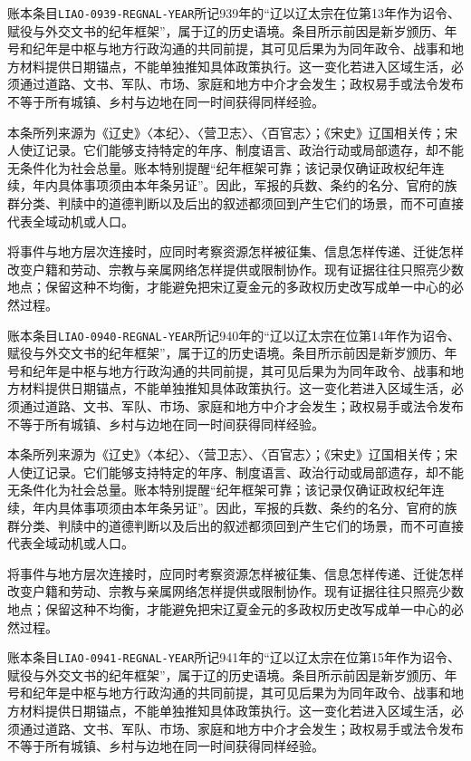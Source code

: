 账本条目\texttt{LIAO-0939-REGNAL-YEAR}所记939年的“辽以辽太宗在位第13年作为诏令、赋役与外交文书的纪年框架”，属于辽的历史语境。条目所示前因是新岁颁历、年号和纪年是中枢与地方行政沟通的共同前提，其可见后果为为同年政令、战事和地方材料提供日期锚点，不能单独推知具体政策执行。这一变化若进入区域生活，必须通过道路、文书、军队、市场、家庭和地方中介才会发生；政权易手或法令发布不等于所有城镇、乡村与边地在同一时间获得同样经验。

本条所列来源为《辽史》〈本纪〉、〈营卫志〉、〈百官志〉；《宋史》辽国相关传；宋人使辽记录。它们能够支持特定的年序、制度语言、政治行动或局部遗存，却不能无条件化为社会总量。账本特别提醒“纪年框架可靠；该记录仅确证政权纪年连续，年内具体事项须由本年条另证”。因此，军报的兵数、条约的名分、官府的族群分类、判牍中的道德判断以及后出的叙述都须回到产生它们的场景，而不可直接代表全域动机或人口。

将事件与地方层次连接时，应同时考察资源怎样被征集、信息怎样传递、迁徙怎样改变户籍和劳动、宗教与亲属网络怎样提供或限制协作。现有证据往往只照亮少数地点；保留这种不均衡，才能避免把宋辽夏金元的多政权历史改写成单一中心的必然过程。

账本条目\texttt{LIAO-0940-REGNAL-YEAR}所记940年的“辽以辽太宗在位第14年作为诏令、赋役与外交文书的纪年框架”，属于辽的历史语境。条目所示前因是新岁颁历、年号和纪年是中枢与地方行政沟通的共同前提，其可见后果为为同年政令、战事和地方材料提供日期锚点，不能单独推知具体政策执行。这一变化若进入区域生活，必须通过道路、文书、军队、市场、家庭和地方中介才会发生；政权易手或法令发布不等于所有城镇、乡村与边地在同一时间获得同样经验。

本条所列来源为《辽史》〈本纪〉、〈营卫志〉、〈百官志〉；《宋史》辽国相关传；宋人使辽记录。它们能够支持特定的年序、制度语言、政治行动或局部遗存，却不能无条件化为社会总量。账本特别提醒“纪年框架可靠；该记录仅确证政权纪年连续，年内具体事项须由本年条另证”。因此，军报的兵数、条约的名分、官府的族群分类、判牍中的道德判断以及后出的叙述都须回到产生它们的场景，而不可直接代表全域动机或人口。

将事件与地方层次连接时，应同时考察资源怎样被征集、信息怎样传递、迁徙怎样改变户籍和劳动、宗教与亲属网络怎样提供或限制协作。现有证据往往只照亮少数地点；保留这种不均衡，才能避免把宋辽夏金元的多政权历史改写成单一中心的必然过程。

账本条目\texttt{LIAO-0941-REGNAL-YEAR}所记941年的“辽以辽太宗在位第15年作为诏令、赋役与外交文书的纪年框架”，属于辽的历史语境。条目所示前因是新岁颁历、年号和纪年是中枢与地方行政沟通的共同前提，其可见后果为为同年政令、战事和地方材料提供日期锚点，不能单独推知具体政策执行。这一变化若进入区域生活，必须通过道路、文书、军队、市场、家庭和地方中介才会发生；政权易手或法令发布不等于所有城镇、乡村与边地在同一时间获得同样经验。


